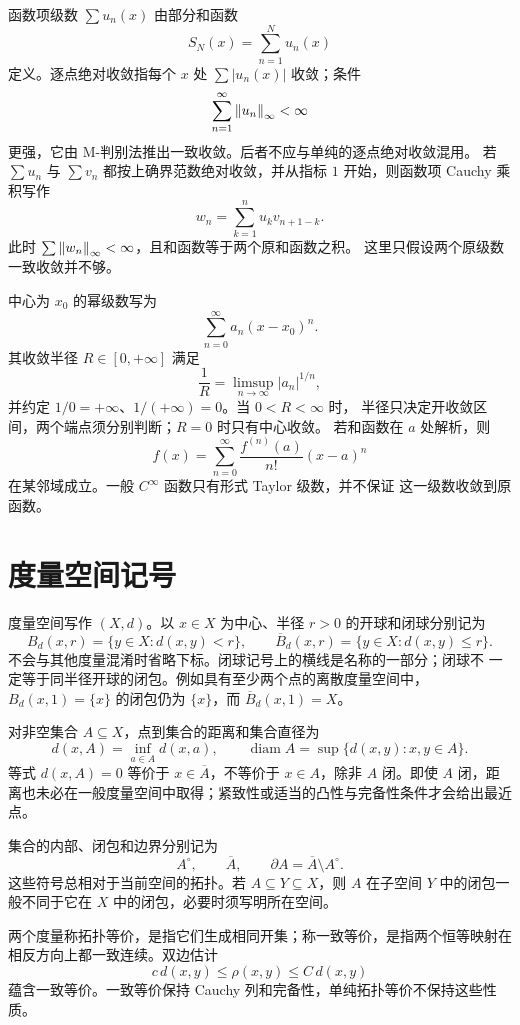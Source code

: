 函数项级数 \(\sum u_n(x)\) 由部分和函数
\[
 S_N(x)=\sum_{n=1}^Nu_n(x)
\]
定义。逐点绝对收敛指每个 \(x\) 处 \(\sum|u_n(x)|\) 收敛；条件
\[
 \sum_{n=1}^\infty\left\lVert u_n\right\rVert_\infty<\infty
\]
更强，它由 M-判别法推出一致收敛。后者不应与单纯的逐点绝对收敛混用。
若 \(\sum u_n\) 与 \(\sum v_n\) 都按上确界范数绝对收敛，并从指标
\(1\) 开始，则函数项 Cauchy 乘积写作
\[
 w_n=\sum_{k=1}^n u_kv_{n+1-k}.
\]
此时 \(\sum\left\lVert w_n\right\rVert_\infty<\infty\)，且和函数等于两个原和函数之积。
这里只假设两个原级数一致收敛并不够。

中心为 \(x_0\) 的幂级数写为
\[
 \sum_{n=0}^\infty a_n(x-x_0)^n.
\]
其收敛半径 \(R\in[0,+\infty]\) 满足
\[
 \frac1R=\limsup_{n\to\infty}|a_n|^{1/n},
\]
并约定 \(1/0=+\infty\)、\(1/(+\infty)=0\)。当 \(0<R<\infty\) 时，
半径只决定开收敛区间，两个端点须分别判断；\(R=0\) 时只有中心收敛。
若和函数在 \(a\) 处解析，则
\[
 f(x)=\sum_{n=0}^\infty\frac{f^{(n)}(a)}{n!}(x-a)^n
\]
在某邻域成立。一般 \(C^\infty\) 函数只有形式 Taylor 级数，并不保证
这一级数收敛到原函数。

\section{度量空间记号}

度量空间写作 \((X,d)\)。以 \(x\in X\) 为中心、半径 \(r>0\) 的开球和闭球分别记为
\[
 B_d(x,r)=\{y\in X:d(x,y)<r\},\qquad
 \overline B_d(x,r)=\{y\in X:d(x,y)\le r\}.
\]
不会与其他度量混淆时省略下标。闭球记号上的横线是名称的一部分；闭球不
一定等于同半径开球的闭包。例如具有至少两个点的离散度量空间中，
\(B_d(x,1)=\{x\}\) 的闭包仍为 \(\{x\}\)，而 \(\overline B_d(x,1)=X\)。

对非空集合 \(A\subseteq X\)，点到集合的距离和集合直径为
\[
 d(x,A)=\inf_{a\in A}d(x,a),\qquad
 \operatorname{diam}A=\sup\{d(x,y):x,y\in A\}.
\]
等式 \(d(x,A)=0\) 等价于 \(x\in\overline A\)，不等价于 \(x\in A\)，除非 \(A\) 闭。即使 \(A\) 闭，距离也未必在一般度量空间中取得；紧致性或适当的凸性与完备性条件才会给出最近点。

集合的内部、闭包和边界分别记为
\[
 A^\circ,\qquad \overline A,\qquad \partial A
 =\overline A\setminus A^\circ.
\]
这些符号总相对于当前空间的拓扑。若 \(A\subseteq Y\subseteq X\)，则 \(A\) 在子空间 \(Y\) 中的闭包一般不同于它在 \(X\) 中的闭包，必要时须写明所在空间。

两个度量称拓扑等价，是指它们生成相同开集；称一致等价，是指两个恒等映射在相反方向上都一致连续。双边估计
\[
 c\,d(x,y)\le \rho(x,y)\le C\,d(x,y)
\]
蕴含一致等价。一致等价保持 Cauchy 列和完备性，单纯拓扑等价不保持这些性质。


